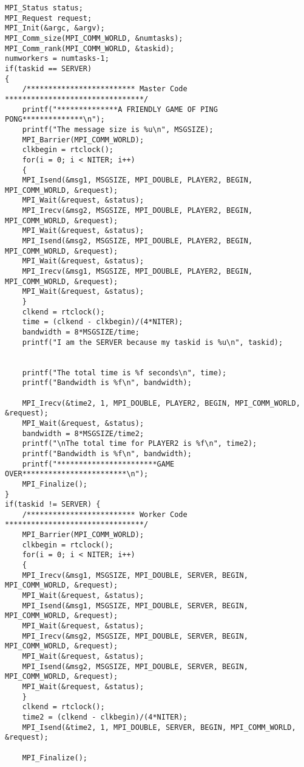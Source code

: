 \documentclass[11pt]{article}
\begin{document}
\begin{enumerate}
\begin{center}
\begin{lstlisting}
MPI_Status status;
MPI_Request request;
MPI_Init(&argc, &argv);
MPI_Comm_size(MPI_COMM_WORLD, &numtasks);
MPI_Comm_rank(MPI_COMM_WORLD, &taskid);
numworkers = numtasks-1;
if(taskid == SERVER)
{
	/************************* Master Code ********************************/
	printf("**************A FRIENDLY GAME OF PING PONG**************\n");
	printf("The message size is %u\n", MSGSIZE);
	MPI_Barrier(MPI_COMM_WORLD);
	clkbegin = rtclock();
	for(i = 0; i < NITER; i++)
	{
	MPI_Isend(&msg1, MSGSIZE, MPI_DOUBLE, PLAYER2, BEGIN, MPI_COMM_WORLD, &request);
	MPI_Wait(&request, &status);
	MPI_Irecv(&msg2, MSGSIZE, MPI_DOUBLE, PLAYER2, BEGIN, MPI_COMM_WORLD, &request);
	MPI_Wait(&request, &status);
	MPI_Isend(&msg2, MSGSIZE, MPI_DOUBLE, PLAYER2, BEGIN, MPI_COMM_WORLD, &request);
	MPI_Wait(&request, &status);
	MPI_Irecv(&msg1, MSGSIZE, MPI_DOUBLE, PLAYER2, BEGIN, MPI_COMM_WORLD, &request);
	MPI_Wait(&request, &status);
	}
	clkend = rtclock();
	time = (clkend - clkbegin)/(4*NITER);
	bandwidth = 8*MSGSIZE/time;
	printf("I am the SERVER because my taskid is %u\n", taskid);
	
																																					  
	printf("The total time is %f seconds\n", time);
	printf("Bandwidth is %f\n", bandwidth);
	
	MPI_Irecv(&time2, 1, MPI_DOUBLE, PLAYER2, BEGIN, MPI_COMM_WORLD, &request);
	MPI_Wait(&request, &status);
	bandwidth = 8*MSGSIZE/time2;
	printf("\nThe total time for PLAYER2 is %f\n", time2);
	printf("Bandwidth is %f\n", bandwidth);
	printf("***********************GAME OVER************************\n");
	MPI_Finalize();
} 
if(taskid != SERVER) {
	/************************* Worker Code ********************************/
	MPI_Barrier(MPI_COMM_WORLD);
	clkbegin = rtclock();
	for(i = 0; i < NITER; i++)
	{
	MPI_Irecv(&msg1, MSGSIZE, MPI_DOUBLE, SERVER, BEGIN, MPI_COMM_WORLD, &request);
	MPI_Wait(&request, &status);
	MPI_Isend(&msg1, MSGSIZE, MPI_DOUBLE, SERVER, BEGIN, MPI_COMM_WORLD, &request);
	MPI_Wait(&request, &status);
	MPI_Irecv(&msg2, MSGSIZE, MPI_DOUBLE, SERVER, BEGIN, MPI_COMM_WORLD, &request);
	MPI_Wait(&request, &status);
	MPI_Isend(&msg2, MSGSIZE, MPI_DOUBLE, SERVER, BEGIN, MPI_COMM_WORLD, &request);
	MPI_Wait(&request, &status);
	}
	clkend = rtclock();
	time2 = (clkend - clkbegin)/(4*NITER);
	MPI_Isend(&time2, 1, MPI_DOUBLE, SERVER, BEGIN, MPI_COMM_WORLD, &request);
	
	MPI_Finalize();
	

\end{lstlisting}
\end{center}
\end{enumerate}
\end{document}
